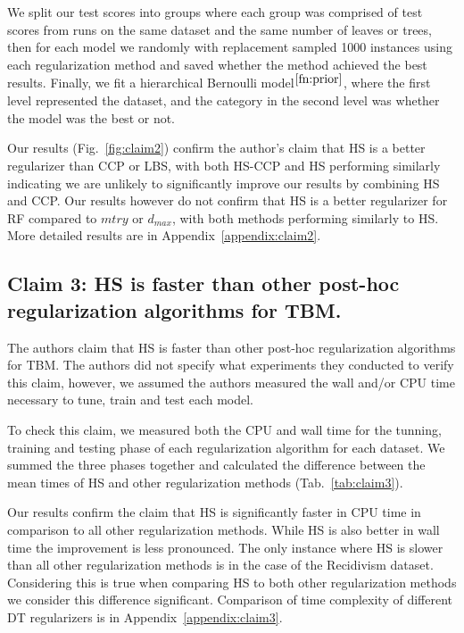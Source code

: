 We split our test scores into groups where each group was comprised of test scores from runs on the same dataset and the same number of leaves or trees, then for each model we randomly with replacement sampled 1000 instances using each regularization method and saved whether the method achieved the best results. Finally, we fit a hierarchical Bernoulli model$^{\ref{fn:prior}}$, where the first level represented the dataset, and the category in the second level was whether the model was the best or not.

Our results (Fig.~\ref{fig:claim2}) confirm the author's claim that HS is a better regularizer than CCP or LBS, with both HS-CCP and HS performing similarly indicating we are unlikely to significantly improve our results by combining HS and CCP.
Our results however do not confirm that HS is a better regularizer for RF compared to $mtry$ or $d_{max}$, with both methods performing similarly to HS.  More detailed results are in Appendix~\ref{appendix:claim2}.

\subsection{Claim 3: HS is faster than other post-hoc regularization algorithms for TBM.}

The authors claim that HS is faster than other post-hoc regularization algorithms for TBM.
The authors did not specify what experiments they conducted to verify this claim, however, we assumed the authors measured the wall and/or CPU time necessary to tune, train and test each model.

To check this claim, we measured both the CPU and wall time for the tunning, training and testing phase of each regularization algorithm for each dataset.
We summed the three phases together and calculated the difference between the mean times of HS and other regularization methods (Tab.~\ref{tab:claim3}).

Our results confirm the claim that HS is significantly faster in CPU time in comparison to all other regularization methods. 
While HS is also better in wall time the improvement is less pronounced.
The only instance where HS is slower than all other regularization methods is in the case of the Recidivism dataset. 
Considering this is true when comparing HS to both other regularization methods we consider this difference significant. Comparison of time complexity of different DT regularizers is in Appendix~\ref{appendix:claim3}.

